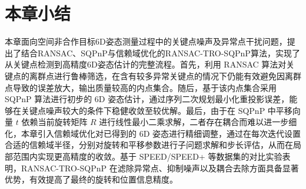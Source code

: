 \section{本章小结}
\label{sec:RANSAC-TRO-SQPnP:conclusion}

本章面向空间非合作目标6D姿态测量过程中的关键点噪声及异常点干扰问题，提出了结合RANSAC、SQPnP与信赖域优化的RANSAC-TRO-SQPnP算法，实现了从关键点检测到高精度6D姿态估计的完整流程。首先，利用 RANSAC 算法对关键点的离群点进行鲁棒筛选，在含有较多异常关键点的情况下仍能有效避免因离群点导致的误差放大，输出质量较高的内点集合。随后，基于该内点集合采用 SQPnP 算法进行初步的 6D 姿态估计，通过序列二次规划最小化重投影误差，能够在关键点噪声较大的条件下稳健收敛至较优解。最后，由于在 SQPnP 中平移向量 $t$ 依赖当前旋转矩阵 $R$ 进行线性最小二乘求解，二者存在耦合而难以进一步细化，本章引入信赖域优化对已得到的 6D 姿态进行精细调整，通过在每次迭代设置合适的信赖域半径，分别对旋转和平移参数进行子问题求解和步长评估，从而在局部范围内实现更高精度的收敛。基于 SPEED/SPEED+ 等数据集的对比实验表明，RANSAC-TRO-SQPnP 在滤除异常点、抑制噪声以及耦合去除方面具备显著优势，有效提高了最终的旋转和位置信息精度。
